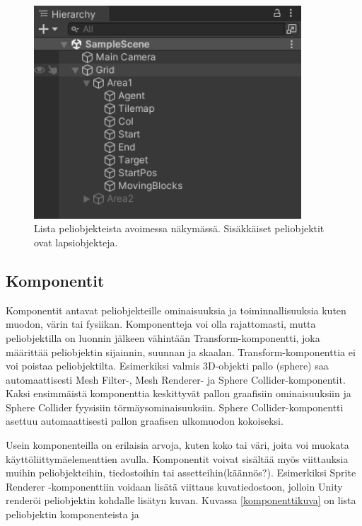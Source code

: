 \documentclass[utf8]{gradu3}
\begin{document}
\begin{figure}[h]
\centering
\includegraphics[width=10cm]{peliobjektilistaus.png}
\caption{Lista peliobjekteista avoimessa näkymässä. Sisäkkäiset peliobjektit ovat lapsiobjekteja.}
\label{peliobjektikuva}
\end{figure}

\subsection{Komponentit}

Komponentit antavat peliobjekteille ominaisuuksia ja toiminnallisuuksia kuten muodon, värin tai fysiikan. Komponentteja voi olla rajattomasti, mutta peliobjektilla on luonnin jälkeen vähintään Transform-komponentti, joka määrittää peliobjektin sijainnin, suunnan ja skaalan. Transform-komponenttia ei voi poistaa peliobjektilta. Esimerkiksi valmis 3D-objekti pallo (sphere) saa automaattisesti Mesh Filter-, Mesh Renderer- ja Sphere Collider-komponentit. Kaksi ensimmäistä komponenttia keskittyvät pallon graafisiin ominaisuuksiin ja Sphere Collider fyysisiin törmäysominaisuuksiin. Sphere Collider-komponentti asettuu automaattisesti pallon graafisen ulkomuodon kokoiseksi.

Usein komponenteilla on erilaisia arvoja, kuten koko tai väri, joita voi muokata käyttöliittymäelementtien avulla. Komponentit voivat sisältää myös viittauksia muihin peliobjekteihin, tiedostoihin tai assetteihin(käännös?). Esimerkiksi Sprite Renderer -komponenttiin voidaan lisätä viittaus kuvatiedostoon, jolloin Unity renderöi peliobjektin kohdalle lisätyn kuvan. Kuvassa \ref{komponenttikuva} on lista peliobjektin komponenteista ja 
\end{document}
